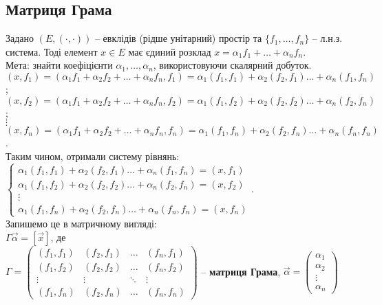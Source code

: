 \documentclass[a4paper, 10pt]{article}
\theoremstyle{theoremdd}
\begin{document}
\subsection{Матриця Грама}
Задано $(E,(\cdot,\cdot))$ -- евклідів (рідше унітарний) простір та $\{f_1,\dots,f_n\}$ -- л.н.з. система. Тоді елемент $x \in E$ має єдиний розклад $x = \alpha_1 f_1 + \dots + \alpha_n f_n$.\\
Мета: знайти коефіцієнти $\alpha_1,\dots,\alpha_n$, використовуючи скалярний добуток.\\
$(x,f_1) = (\alpha_1 f_1 + \alpha_2 f_2 + \dots + \alpha_n f_n, f_1) = \alpha_1 (f_1,f_1) + \alpha_2 (f_2,f_1) \dots + \alpha_n (f_1,f_n)$;\\
$(x,f_2) = (\alpha_1 f_1 + \alpha_2 f_2 + \dots + \alpha_n f_n, f_2) = \alpha_1 (f_1,f_2) + \alpha_2 (f_2,f_2) \dots + \alpha_n (f_2,f_n)$;\\
$\vdots$\\
$(x,f_n) = (\alpha_1 f_1 + \alpha_2 f_2 + \dots + \alpha_n f_n, f_n) = \alpha_1 (f_1,f_n) + \alpha_2 (f_2,f_n) \dots + \alpha_n (f_n,f_n)$.\\
Таким чином, отримали систему рівнянь:\\
$\begin{cases}
\alpha_1 (f_1,f_1) + \alpha_2 (f_2,f_1) \dots + \alpha_n (f_1,f_n) = (x,f_1) \\
\alpha_1 (f_1,f_2) + \alpha_2 (f_2,f_2) \dots + \alpha_n (f_2,f_n) = (x,f_2) \\
\vdots \\
\alpha_1 (f_1,f_n) + \alpha_2 (f_2,f_n) \dots + \alpha_n (f_n,f_n) = (x,f_n)
\end{cases}$.\\
Запишемо це в матричному вигляді:\\
$\Gamma \vec{\alpha} = [\vec{x}]$, де\\
$\Gamma = \begin{pmatrix}
(f_1,f_1) & (f_2,f_1) & \dots & (f_n,f_1) \\
(f_1,f_2) & (f_2,f_2) & \dots & (f_n,f_2) \\
\vdots & \vdots & \ddots & \vdots \\
(f_1,f_n) & (f_2,f_n) & \dots & (f_n,f_n)
\end{pmatrix}$ -- \textbf{матриця Грама}, \hspace{0.5cm}
$\vec{\alpha} = \begin{pmatrix}
\alpha_1 \\ \alpha_2 \\ \vdots \\ \alpha_n
\end{pmatrix}$ \hspace{1cm}
\end{document}
